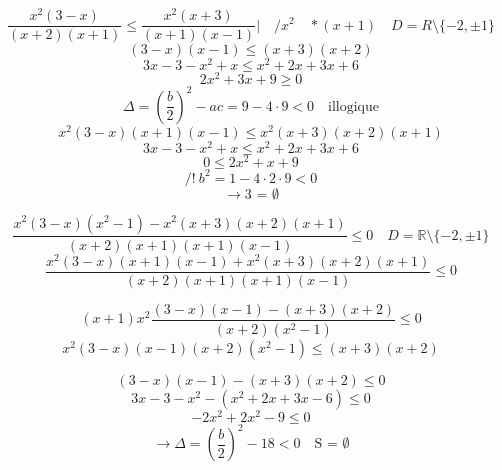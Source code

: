 \documentclass{article}
\begin{document}
\[
\frac{x^2(3-x)}{(x+2)(x+1)} \le \frac{x^2(x+3)}{(x+1)(x-1)} | \quad / x^2 \quad *(x+1) \quad D = R \setminus \{-2, \pm 1\}
\]
\[
(3-x)(x-1) \le (x+3)(x+2)
\]
\[
3x - 3 - x^2 + x \le x^2 + 2x + 3x + 6
\]
\[
2x^2 + 3x + 9 \ge 0
\]
\[
\Delta = (\frac{b}{2})^2 - ac = 9 - 4 \cdot 9 < 0 \quad \text{illogique}
\]
\[
x^2(3-x)(x+1)(x-1) \le x^2(x+3)(x+2)(x+1)
\]
\[
3x - 3 - x^2 + x \le x^2 + 2x + 3x + 6
\]
\[
0 \le 2x^2 + x + 9
\]
\[
/!\ b^2 = 1 - 4 \cdot 2 \cdot 9 < 0
\]
\[
\rightarrow \text{3 = } \emptyset
\]

\[ 
\frac{x^2(3-x)(x^2-1) - x^2(x+3)(x+2)(x+1)}{(x+2)(x+1)(x+1)(x-1)} \le 0 \quad D=\mathbb{R}\setminus\{-2, \pm 1\} 
\]
\[ 
\frac{x^2(3-x)(x+1)(x-1) + x^2(x+3)(x+2)(x+1)}{(x+2)(x+1)(x+1)(x-1)} \le 0 
\]

\[ 
(x+1)x^2\frac{(3-x)(x-1) - (x+3)(x+2)}{(x+2)(x^2-1)} \le 0 
\] 
\[ 
x^2(3-x)(x-1)(x+2)(x^2-1) \le (x+3)(x+2) 
\]

\[
(3-x)(x-1) - (x+3)(x+2) \le 0
\]
\[
3x - 3 - x^2 - (x^2 + 2x + 3x - 6) \le 0
\]
\[
-2x^2 + 2x^2 - 9 \le 0
\]
\[
\rightarrow \Delta = (\frac{b}{2})^2 - 18 < 0 \quad \text{S = } \emptyset
\]
\end{document}
